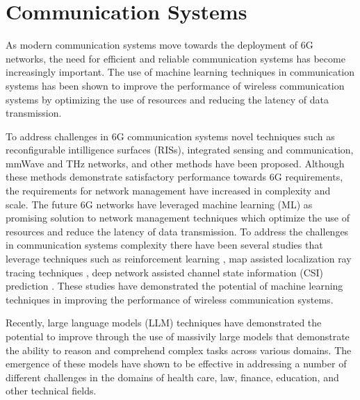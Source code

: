 \section{Communication Systems}
As modern communication systems move towards the deployment of 6G networks, the need for efficient and reliable communication systems has become increasingly important. The use of machine learning techniques in communication systems has been shown to improve the performance of wireless communication systems by optimizing the use of resources and reducing the latency of data transmission.

To address challenges in 6G communication systems novel techniques such as reconfigurable intilligence surfaces (RISs), integrated sensing and communication, mmWave and THz networks, and other methods have been proposed. \cite{zhou2023survey} Although these methods demonstrate satisfactory performance towards 6G requirements, the requirements for network management have increased in complexity and scale. The future 6G networks have leveraged machine learning (ML) as promising solution to network management techniques which optimize the use of resources and reduce the latency of data transmission. \cite{zhou2024large} To address the challenges in communication systems complexity there have been several studies that leverage techniques such as reinforcement learning \cite{zhou2021ran}, map assisted localization ray tracing techniques \cite{vuckovic2021map}, deep network assisted channel state information (CSI) prediction \cite{vuckovic2024csi}. These studies have demonstrated the potential of machine learning techniques in improving the performance of wireless communication systems. 

Recently, large language models (LLM) techniques have demonstrated the potential to improve through the use of massivily large models that demonstrate the ability to reason and comprehend complex tasks across various domains. The emergence of these models have shown to be effective in addressing a number of different challenges in the domains of health care, law, finance, education, and other technical fields.%

